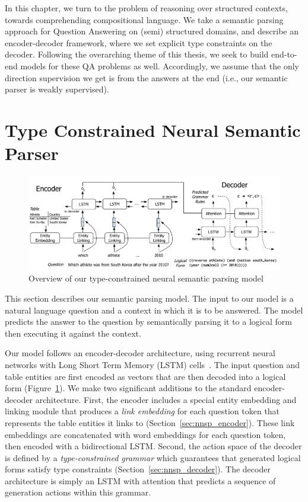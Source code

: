 In this chapter, we turn to the problem of reasoning over structured contexts, 
towards comprehending compositional language. We take a semantic parsing 
approach for Question Answering on (semi) structured
domains, and describe an encoder-decoder framework, where we set explicit type 
constraints on the decoder. Following the overarching theme of this thesis, we 
seek to build end-to-end models for these QA problems
as well. Accordingly, we assume that the only direction supervision we get is 
from the answers at the end (i.e., our semantic parser is weakly supervised).

\section{Type Constrained Neural Semantic Parser}
\begin{figure}
\centering
\includegraphics[width=6in]{figures/type_constrained_nnsp.png}
\caption{Overview of our type-constrained neural semantic parsing model}
\label{fig:nnsp_model}
\end{figure}

This section describes our semantic parsing model.
The input to our model is a natural language question and a context in which it 
is to be answered.
The model predicts the answer to the question by semantically parsing it to a 
logical form then executing it against the context.

Our model follows an encoder-decoder architecture, using recurrent neural 
networks with Long Short Term Memory (LSTM) cells~\citep{hochreiter1997long}. 
The input question and table entities are first encoded as vectors that are 
then decoded into a logical form (Figure~\ref{fig:nnsp_model}).
We make two significant additions to the standard encoder-decoder architecture.
First, the encoder includes a special entity embedding and linking module that 
produces a \emph{link embedding} for each question token that represents the 
table entities it links to (Section~\ref{sec:nnsp_encoder}).
These link embeddings are concatenated with word embeddings for each question 
token, then encoded with a bidirectional LSTM\@.
Second, the action space of the decoder is defined by a \emph{type-constrained 
grammar} which guarantees that generated logical forms satisfy type constraints 
(Section~\ref{sec:nnsp_decoder}).
The decoder architecture is simply an LSTM with attention that predicts a 
sequence of generation actions within this grammar.

